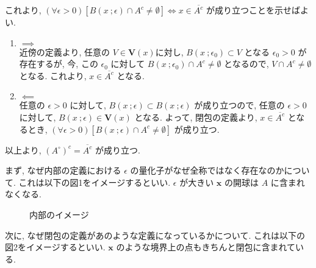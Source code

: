 \begin{nmprob}
{これより, $(\forall \epsilon > 0)[B(x\ ;\epsilon) \cap A^c \neq \emptyset] \iff x \in \overline{A^c}$ が成り立つことを示せばよい.
\begin{enumerate}
    \item $\implies$\\
    近傍の定義より, 任意の $V \in \bm{V}(x)$に対し, $B(x\ ;\epsilon_0) \subset V$ となる $\epsilon_0 > 0$ が存在するが, 今, この $\epsilon_0$ に対して $B(x\ ;\epsilon_0) \cap A^c \neq \emptyset$
    となるので, $V \cap A^c \neq \emptyset$ となる. これより, $x \in \overline{A^c}$ となる.
    \item $\impliedby$\\ 
    任意の $\epsilon > 0$ に対して, $B(x\ ;\epsilon) \subset B(x\ ;\epsilon)$ が成り立つので, 任意の $\epsilon > 0$ に対して, $B(x\ ;\epsilon) \in \bm{V}(x)$ となる.
    よって, 閉包の定義より, $x \in \overline{A^c}$ となるとき, $(\forall \epsilon > 0)[B(x\ ;\epsilon) \cap A^c \neq \emptyset]$ が成り立つ.
\end{enumerate}
以上より, $(A^\circ)^c = \overline{A^c}$ が成り立つ.
}
\newpage
{}

まず, なぜ内部の定義における $\epsilon$ の量化子がなぜ全称ではなく存在なのかについて. これは以下の図1をイメージするといい.
$\epsilon$ が大きい $\bm{x}$ の開球は $A$ に含まれなくなる.
\begin{figure}[htbp]
    \centering
    \caption{内部のイメージ}
\end{figure}

次に, なぜ閉包の定義があのような定義になっているかについて. これは以下の図2をイメージするといい.
$\bm{x}$ のような境界上の点もきちんと閉包に含まれている.
\begin{figure}[htbp]
\centering
{}
\end{figure}
\end{nmprob}
